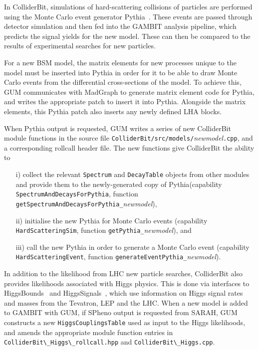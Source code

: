 \documentclass[pdftex,twocolumn,epjc3_preprint,runningheads]{svjour3}
\renewcommand{\_}{\discretionary{\underscore}{}{\underscore}}
\newcommand\cpp[1]{{\lstinline!#1!}}  %
\newcommand\term[1]{{\lstset{style=terminal}\lstinline!#1!\lstset{style=cpp}}}
\newcommand{\metavarf}[1]{\textit{\color{darkgreen}\footnotesize\textrm{#1}}}
\newcommand{\metavar}{\metavarf}
\newcommand{\gambit}{\textsf{GAMBIT}\xspace}
\newcommand{\colliderbit}{\textsf{ColliderBit}\xspace}
\newcommand{\GB}{\gambit}
\newcommand{\pythia}{\textsf{Pythia}\xspace}
\newcommand{\madgraph}{\textsf{MadGraph}\xspace}
\newcommand{\higgsbounds}{\textsf{HiggsBounds}\xspace}
\newcommand{\higgssignals}{\textsf{HiggsSignals}\xspace}
\newcommand{\gum}{\textsf{GUM}\xspace}
\newcommand{\sarah}{\textsf{SARAH}\xspace}
\newcommand{\spheno}{\textsf{SPheno}\xspace}
\newcommand{\nm}{\metavar{new\_model}}
\begin{document}
In \colliderbit, simulations of hard-scattering collisions of particles are performed using the Monte Carlo event generator \pythia~\cite{Sjostrand:2014zea}. These events are passed through detector simulation and then fed into the \GB analysis pipeline, which predicts the signal yields for the new model.  These can then be compared to the results of experimental searches for new particles.

For a new BSM model, the matrix elements for new processes unique to the model must be inserted into \pythia in order for it to be able to draw Monte Carlo events from the differential cross-sections of the model. To achieve this, \gum communicates with \madgraph to generate matrix element code for \pythia, and writes the appropriate patch to insert it into \pythia. Alongside the matrix elements, this \pythia patch also inserts any newly defined LHA blocks.

When \pythia output is requested, \gum writes a series of new \colliderbit module functions in the source file \term{ColliderBit/src/models/}\nm\term{.cpp}, and a corresponding rollcall header file.  The new functions give \colliderbit the ability to \begin{itemize}
\item[i)] collect the relevant \cpp{Spectrum} and \cpp{DecayTable} objects from other modules and provide them to the newly-generated copy of \pythia (capability \cpp{SpectrumAndDecaysForPythia}, function \cpp{getSpectrumAndDecaysForPythia_}\nm),
\item[ii)] initialise the new \pythia for Monte Carlo events (capability \cpp{HardScatteringSim}, function \cpp{getPythia_}\nm), and
\item[iii)] call the new \pythia in order to generate a Monte Carlo event (capability \cpp{HardScatteringEvent}, function \cpp{generateEventPythia_}\nm).
\end{itemize}

In addition to the likelihood from LHC new particle searches, \colliderbit also provides likelihoods associated with Higgs physics. This is done via interfaces to \higgsbounds~\cite{Bechtle:2008jh,Bechtle:2011sb,Bechtle:2013wla,arXiv:1507.06706} and \higgssignals~\cite{HiggsSignals,Bechtle:2014ewa}, which use information on Higgs signal rates and masses from the Tevatron, LEP and the LHC. When a new model is added to \GB with \gum, if \spheno output is requested from \sarah, \gum constructs a new \cpp{HiggsCouplingsTable} used as input to the Higgs likelihoods, and amends the appropriate module function entries in \term{ColliderBit\_Higgs\_rollcall.hpp} and \term{ColliderBit\_Higgs.cpp}.
\end{document}
